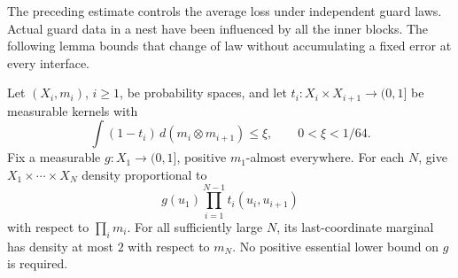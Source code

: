 The preceding estimate controls the average loss under independent
guard laws. Actual guard data in a nest have been influenced by
all the inner blocks. The following lemma bounds that change of law
without accumulating a fixed error at every interface.

\begin{lemma}
\label{kernels:stability}
Let \((X_i,m_i)\), \(i\ge1\), be probability spaces, and let
\(t_i:X_i\times X_{i+1}\to(0,1]\) be measurable kernels with
\[
 \int(1-t_i)\,d(m_i\otimes m_{i+1})\le\xi,\qquad
                         0<\xi<1/64.
\]
Fix a measurable \(g:X_1\to(0,1]\), positive \(m_1\)-almost
everywhere. For each \(N\), give \(X_1\times\cdots\times X_N\)
density proportional to
\[
                    g(u_1)\prod_{i=1}^{N-1}t_i(u_i,u_{i+1})
\]
with respect to \(\prod_i m_i\). For all sufficiently large \(N\),
its last-coordinate marginal has density at most \(2\) with respect
to \(m_N\). No positive essential lower bound on \(g\) is required.
\end{lemma}

